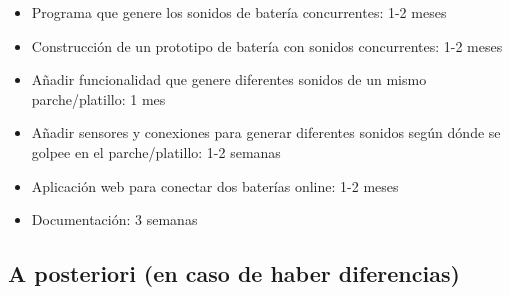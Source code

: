             \begin{itemize}
                \item
                    Programa que genere los sonidos de batería concurrentes: 1-2 meses
                \item
                    Construcción de un prototipo de batería con sonidos concurrentes: 1-2 meses
                \item
                    Añadir funcionalidad que genere diferentes sonidos de un mismo parche/platillo: 1 mes
                \item
                    Añadir sensores y conexiones para generar diferentes sonidos según dónde se golpee en el
                    parche/platillo: 1-2 semanas
                \item
                    Aplicación web para conectar dos baterías online: 1-2 meses
                \item
                    Documentación: 3 semanas
            \end{itemize}


        \subsection{A posteriori (en caso de haber diferencias)} %
        \label{sub:APosterioriEnCasoDeHaberDiferencias)}



